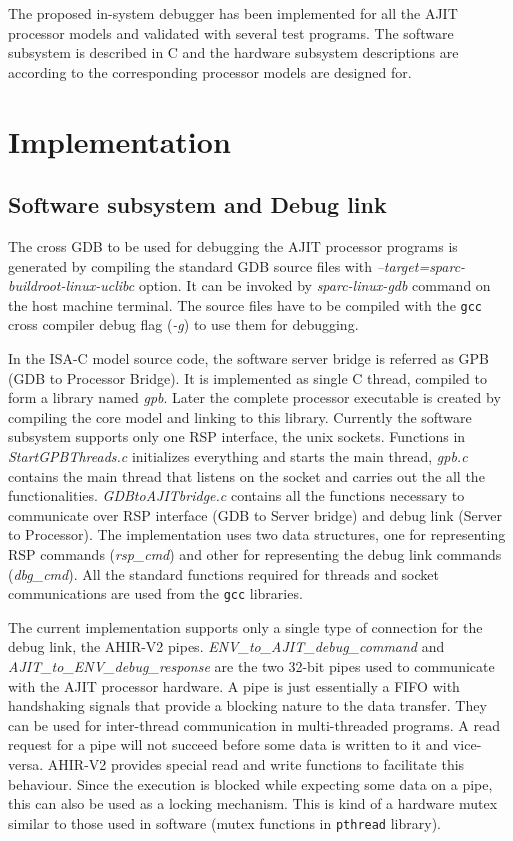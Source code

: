 
The proposed in-system debugger has been implemented for all the AJIT processor models and validated with several test programs. The software subsystem is described in C and the hardware subsystem descriptions are according to the corresponding processor models are designed for.

\section{Implementation}
\subsection{Software subsystem and Debug link}
The cross GDB to be used for debugging the AJIT processor programs is generated by compiling the standard GDB source files with \textit{--target=sparc-buildroot-linux-uclibc} option. It can be invoked by \textit{sparc-linux-gdb} command on the host machine terminal. The source files have to be compiled with the \texttt{gcc}\cite{gcc} cross compiler debug flag (\textit{-g}) to use them for debugging.

In the ISA-C model source code, the software server bridge is referred as GPB (GDB to Processor Bridge). It is implemented as single C thread, compiled to form a library named \textit{gpb}. Later the complete processor executable is created by compiling the core model and linking to this library. Currently the software subsystem supports only one RSP interface, the unix sockets. Functions in \textit{StartGPBThreads.c} initializes everything and starts the main thread,  \textit{gpb.c} contains the main thread that listens on the socket and carries out the all the functionalities. \textit{GDBtoAJITbridge.c} contains all the functions necessary to communicate over RSP interface (GDB to Server bridge) and debug link (Server to Processor). The implementation uses two data structures, one for representing RSP commands (\textit{rsp\_cmd}) and other for representing the debug link commands (\textit{dbg\_cmd}). All the standard functions required for threads and socket communications are used from the \texttt{gcc} libraries.

The current implementation supports only a single type of connection for the debug link, the AHIR-V2 \cite{AhirThesis} pipes. \textit{ENV\_to\_AJIT\_debug\_command} and \textit{AJIT\_to\_ENV\_debug\_response} are the two 32-bit pipes used to communicate with the AJIT processor hardware. A pipe is just essentially a FIFO with handshaking signals that provide a blocking nature to the data transfer\cite{sarath}. They can be used for inter-thread communication in multi-threaded programs. A read request for a pipe will not succeed before some data is written to it and vice-versa. AHIR-V2 provides special read and write functions to facilitate this behaviour. Since the execution is blocked while expecting some data on a pipe, this can also be used as a locking mechanism. This is kind of a hardware mutex similar to those used in software (mutex functions in \texttt{pthread} library).

